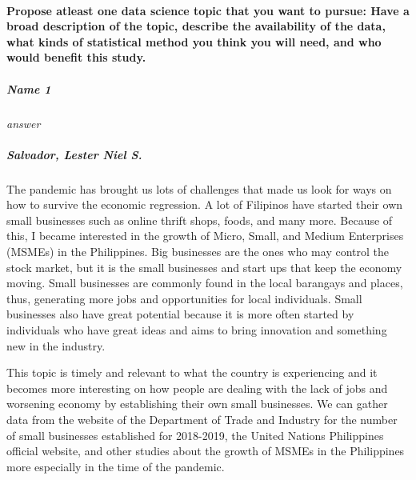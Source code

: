 \documentclass[
]{article}
\begin{document}
\hypertarget{propose-atleast-one-data-science-topic-that-you-want-to-pursue-have-a-broad-description-of-the-topic-describe-the-availability-of-the-data-what-kinds-of-statistical-method-you-think-you-will-need-and-who-would-benefit-this-study.}{%
\paragraph{Propose atleast one data science topic that you want to
pursue: Have a broad description of the topic, describe the availability
of the data, what kinds of statistical method you think you will need,
and who would benefit this
study.}\label{propose-atleast-one-data-science-topic-that-you-want-to-pursue-have-a-broad-description-of-the-topic-describe-the-availability-of-the-data-what-kinds-of-statistical-method-you-think-you-will-need-and-who-would-benefit-this-study.}}

\hypertarget{name-1}{%
\subparagraph{Name 1}\label{name-1}}

\emph{answer}

\hypertarget{salvador-lester-niel-s.}{%
\subparagraph{Salvador, Lester Niel S.}\label{salvador-lester-niel-s.}}

The pandemic has brought us lots of challenges that made us look for
ways on how to survive the economic regression. A lot of Filipinos have
started their own small businesses such as online thrift shops, foods,
and many more. Because of this, I became interested in the growth of
Micro, Small, and Medium Enterprises (MSMEs) in the Philippines. Big
businesses are the ones who may control the stock market, but it is the
small businesses and start ups that keep the economy moving. Small
businesses are commonly found in the local barangays and places, thus,
generating more jobs and opportunities for local individuals. Small
businesses also have great potential because it is more often started by
individuals who have great ideas and aims to bring innovation and
something new in the industry.

This topic is timely and relevant to what the country is experiencing
and it becomes more interesting on how people are dealing with the lack
of jobs and worsening economy by establishing their own small
businesses. We can gather data from the website of the Department of
Trade and Industry for the number of small businesses established for
2018-2019, the United Nations Philippines official website, and other
studies about the growth of MSMEs in the Philippines more especially in
the time of the pandemic.
\end{document}
